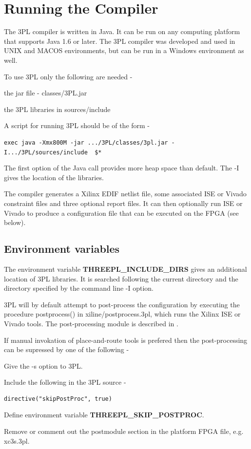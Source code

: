 \pagebreak

\chapter{Running the Compiler}
\label{chap:run3pl}


    The 3PL compiler is written in Java. It can be run on any computing
    platform that supports Java 1.6 or later. The 3PL compiler was developed
    and used in UNIX and MACOS environments, but can be run in a Windows
    environment as well.
    
    To use 3PL only the following are needed -
    \blist
    \item   the jar file - classes/3PL.jar
    \item   the 3PL libraries in sources/include
    \blend
    
    
    A script for running 3PL should be of the form -

    \verb'exec java -Xmx800M -jar .../3PL/classes/3pl.jar -I.../3PL/sources/include  $*'

    The first option of the Java call provides more heap space than default.
    The -I gives the location of the libraries.

    The compiler generates a Xilinx EDIF netlist file, some associated ISE or
    Vivado constraint files and three optional report files. It can then
    optionally run ISE or Vivado to produce a configuration file that can be
    executed on the FPGA (see below).
    

    \section{Environment variables}

        The environment variable {\bf THREEPL\_INCLUDE\_DIRS} gives an
        additional location of 3PL libraries. It is searched following the
        current directory and the directory specified by the command line -I
        option.

        3PL will by default attempt to post-process the configuration by
        executing the procedure postprocess() in xiline/postprocess.3pl,
        which runs the Xilinx ISE or Vivado tools. The post-processing module
        is described in .
        
        If manual invokation of place-and-route tools is prefered
        then the post-processing can be supressed by one of the following -
        \blist
        \item   Give the -s option to 3PL.
        \item   Include the following in the 3PL source -\\
                \begin{lstlisting}[gobble=12, language=threepl]
                    directive("skipPostProc", true)
                \end{lstlisting}
        \item   Define environment variable {\bf THREEPL\_SKIP\_POSTPROC}.
        \item   Remove or comment out the postmodule section in the platform
                FPGA file, e.g. xc3s.3pl.
        \blend
       
